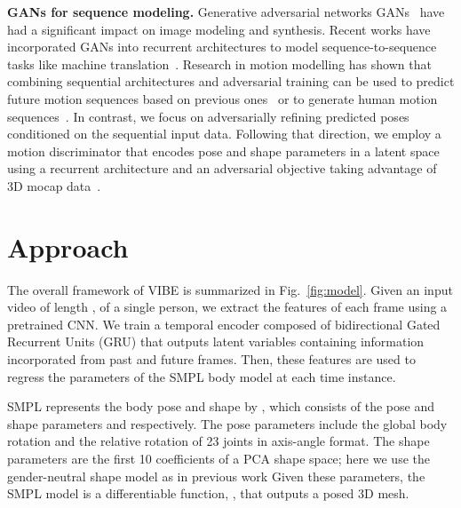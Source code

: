 \documentclass[10pt,twocolumn,letterpaper]{article}
\begin{document}
{\bf GANs for sequence modeling.}
Generative adversarial networks GANs~\cite{arjovsky2017wasserstein,goodfellow_gan,isola2017image,liu2017unsupervised} have had a significant impact on image modeling and synthesis. 
Recent works have incorporated GANs into recurrent architectures to model sequence-to-sequence tasks like machine translation~\cite{sutskever2014sequence,wu_adv_nmt,yang-etal-2018-improving}. Research in motion modelling has shown that combining sequential architectures and adversarial training can be used to predict future motion sequences based on previous ones~\cite{BarsoumCVPRW2018,Gui_2018_ECCV} or to generate human motion sequences~\cite{Aksan_2019_ICCV}. 
In contrast, we focus on adversarially refining predicted poses conditioned on the sequential input data.
Following that direction, we employ a motion discriminator that encodes pose and shape parameters in a latent space using a recurrent architecture and an adversarial objective taking advantage of 3D mocap data~\cite{AMASS:2019}.






















 




\section{Approach}
\label{methods}


The overall framework of VIBE is summarized in Fig.~\ref{fig:model}. 
Given an input video  of length , of a single person, we extract the features of each frame  using a pretrained CNN. We train a temporal encoder composed of bidirectional Gated Recurrent Units (GRU) that outputs latent variables containing information incorporated from past and future frames. Then, these features are used to regress the parameters of the SMPL body model at each time instance.

SMPL represents the body pose and shape by , which consists of the pose and shape parameters  and  respectively. 
The pose parameters include the global body rotation and the relative rotation of 23 joints in axis-angle format. 
The shape parameters are the first 10 coefficients of a PCA shape space; here we use the gender-neutral shape model as in previous work \cite{kanazawa_hmr,SPIN:ICCV:2019}
Given these parameters, the SMPL model is a differentiable function, , that outputs a posed 3D mesh.
\end{document}

